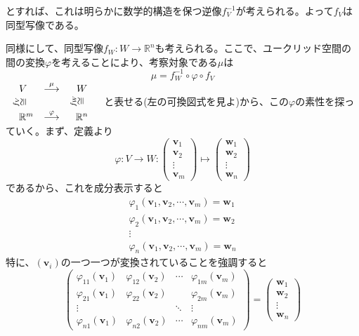 \documentclass[dvipdfmx]{jsarticle}
\begin{document}
とすれば、これは明らかに数学的構造を保つ逆像$f_V^{-1}$が考えられる。よって$f_V$は同型写像である。\par
同様にして、同型写像$f_W:W\rightarrow\mathbb{R}^n$も考えられる。ここで、ユークリッド空間の間の変換$\varphi$を考えることにより、考察対象である$\mu$は
\[\mu=f_W^{-1} \circ \varphi \circ f_V\]
$\left. \begin{array}{ccc}
	V&\overset{\mu}{\longrightarrow}&W\\
	\rotatebox{90}{$\overset{f_V}{\cong}$}~~&{}&\rotatebox{90}{$\overset{f_W}{\cong}$}~~~\\
	~~\mathbb{R}^m&\overset{\varphi}{\longrightarrow}&\mathbb{R}^n
\end{array} \right.$
と表せる(左の可換図式を見よ)から、この$\varphi$の素性を探っていく。まず、定義より
\[\varphi:V \rightarrow W:\begin{pmatrix}\bm{v}_1\\\bm{v}_2\\\vdots\\\bm{v}_m\end{pmatrix}\mapsto\begin{pmatrix}\bm{w}_1\\\bm{w}_2\\\vdots\\\bm{w}_n\end{pmatrix}\]
であるから、これを成分表示すると
\[\begin{array}{ccc}\varphi_1(\bm{v}_1,\bm{v}_2,\cdots,\bm{v}_m)=\bm{w}_1\\\varphi_2(\bm{v}_1,\bm{v}_2,\cdots,\bm{v}_m)=\bm{w}_2\\\vdots\\\varphi_n(\bm{v}_1,\bm{v}_2,\cdots,\bm{v}_m)=\bm{w}_n\end{array}\]
特に、$(\bm{v}_i)$の一つ一つが変換されていることを強調すると
\[\begin{pmatrix}\varphi_{11}(\bm{v}_1)&\varphi_{12}(\bm{v}_2)&\cdots&\varphi_{1m}(\bm{v}_m)\\\varphi_{21}(\bm{v}_1)&\varphi_{22}(\bm{v}_2)&{}&\varphi_{2m}(\bm{v}_m)\\\vdots&{}&\ddots&\vdots\\\varphi_{n1}(\bm{v}_1)&\varphi_{n2}(\bm{v}_2)&\cdots&\varphi_{nm}(\bm{v}_m)\end{pmatrix}=\begin{pmatrix}\bm{w}_1\\\bm{w}_2\\\vdots\\\bm{w}_n\end{pmatrix}\]
\end{document}
